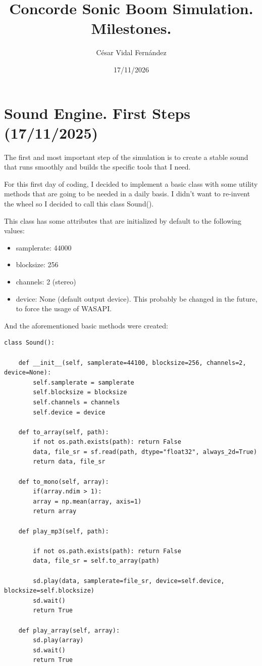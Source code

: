 \documentclass[10.5pt]{article}
\title{Concorde Sonic Boom Simulation. Milestones.}
\author{César Vidal Fernández}
\date{17/11/2026}
\begin{document}
	
	\maketitle	
	\newpage
	
	\tableofcontents
	\newpage
	
	\section{Sound Engine. First Steps (17/11/2025)}
	
	The first and most important step of the simulation is to create a stable sound that runs smoothly and builds the specific tools that I need. 
	
	For this first day of coding, I decided to implement a basic class with some utility methods that are going to be needed in a daily basis. I didn't want to re-invent the wheel so I decided to call this class Sound().
	
	This class has some attributes that are initialized by default to the following values:
	\begin{itemize}
		\item samplerate: 44000
		\item blocksize: 256
		\item channels: 2 (stereo)
		\item device: None (default output device). This probably be changed in the future, to force the usage of WASAPI.
	\end{itemize}  
	
	And the aforementioned basic methods were created:
	
	\begin{lstlisting}
class Sound():

	def __init__(self, samplerate=44100, blocksize=256, channels=2, device=None):
		self.samplerate = samplerate
		self.blocksize = blocksize
		self.channels = channels
		self.device = device
	
	def to_array(self, path):
		if not os.path.exists(path): return False
		data, file_sr = sf.read(path, dtype="float32", always_2d=True)
		return data, file_sr
	
	def to_mono(self, array):
		if(array.ndim > 1):
		array = np.mean(array, axis=1)
		return array
	
	def play_mp3(self, path):
	
		if not os.path.exists(path): return False
		data, file_sr = self.to_array(path)
	
		sd.play(data, samplerate=file_sr, device=self.device, blocksize=self.blocksize)
		sd.wait()
		return True
	
	def play_array(self, array):
		sd.play(array)
		sd.wait()
		return True
	\end{lstlisting}
	
\end{document}
